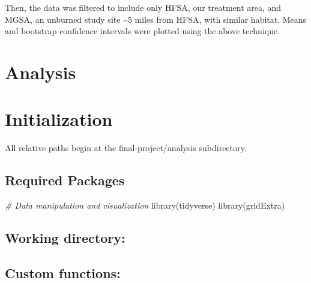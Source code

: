\documentclass[
]{article}
\newenvironment{Shaded}{\begin{snugshade}}{\end{snugshade}}
\newcommand{\AttributeTok}[1]{\textcolor[rgb]{0.77,0.63,0.00}{#1}}
\newcommand{\CommentTok}[1]{\textcolor[rgb]{0.56,0.35,0.01}{\textit{#1}}}
\newcommand{\ConstantTok}[1]{\textcolor[rgb]{0.00,0.00,0.00}{#1}}
\newcommand{\FunctionTok}[1]{\textcolor[rgb]{0.00,0.00,0.00}{#1}}
\newcommand{\NormalTok}[1]{#1}
\newcommand{\SpecialCharTok}[1]{\textcolor[rgb]{0.00,0.00,0.00}{#1}}
\begin{document}
Then, the data was filtered to include only HFSA, our treatment area,
and MGSA, an unburned study site \textasciitilde5 miles from HFSA, with
similar habitat. Means and bootstrap confidence intervals were plotted
using the above technique.

\hypertarget{analysis-1}{%
\section{Analysis}\label{analysis-1}}

\hypertarget{initialization}{%
\section{Initialization}\label{initialization}}

All relative paths begin at the final-project/analysis subdirectory.

\begin{Shaded}
\end{Shaded}

\hypertarget{required-packages}{%
\subsection{Required Packages}\label{required-packages}}

\begin{Shaded}
\begin{Highlighting}[]
\CommentTok{\# Data manipulation and visualization}
\FunctionTok{library}\NormalTok{(tidyverse)}
\FunctionTok{library}\NormalTok{(gridExtra)}
\end{Highlighting}
\end{Shaded}

\hypertarget{working-directory}{%
\subsection{Working directory:}\label{working-directory}}

\hypertarget{custom-functions}{%
\subsection{Custom functions:}\label{custom-functions}}
\end{document}
